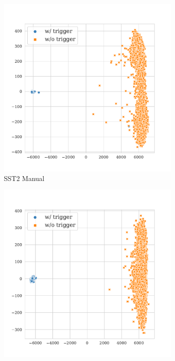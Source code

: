 \begin{figure}[!ht]
\begin{subfigure}{.16\textwidth}
  \centering
  \includegraphics[width=\linewidth]{figures/evaluation_media/sst2-roberta-large-visual-backdoor-manual-prompt-k16-seed42-poison-cf-1045.pdf}
  \caption{\tiny{SST2 Manual}}
  \label{fig:sst2_manual_k16_embed_extra}
\end{subfigure}%
\begin{subfigure}{.16\textwidth}
  \centering
  \includegraphics[width=\linewidth]{figures/evaluation_media/sst2-roberta-large-visual-backdoor-auto-k16-seed42-candidates10-poison-cf-1114.pdf}

\end{subfigure}
\end{figure}
